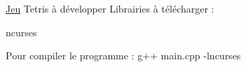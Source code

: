\hyperlink{class_jeu}{Jeu} Tetris à développer Librairies à télécharger \+:
\begin{DoxyItemize}
\item ncurses
\end{DoxyItemize}

Pour compiler le programme \+: g++ main.\+cpp -\/lncurses 